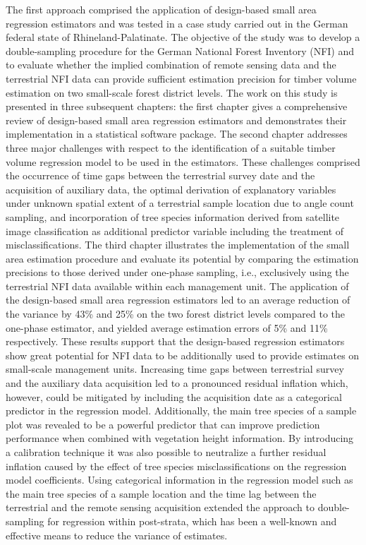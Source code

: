 The first approach comprised the application of design-based small area regression estimators and was tested in a case study carried out in the German federal state of Rhineland-Palatinate. The objective of the study was to develop a double-sampling procedure for the German National Forest Inventory (NFI) and to evaluate whether the implied combination of remote sensing data and the terrestrial NFI data can provide sufficient estimation precision for timber volume estimation on two small-scale forest district levels. The work on this study is presented in three subsequent chapters: the first chapter gives a comprehensive review of design-based small area regression estimators and demonstrates their implementation in a statistical software package. The second chapter addresses three major challenges with respect to the identification of a suitable timber volume regression model to be used in the estimators. These challenges comprised the occurrence of time gaps between the terrestrial survey date and the acquisition of auxiliary data, the optimal derivation of explanatory variables under unknown spatial extent of a terrestrial sample location due to angle count sampling, and incorporation of tree species information derived from satellite image classification as additional predictor variable including the treatment of misclassifications. The third chapter illustrates the implementation of the small area estimation procedure and evaluate its potential by comparing the estimation precisions to those derived under one-phase sampling, i.e., exclusively using the terrestrial NFI data available within each management unit. The application of the design-based small area regression estimators led to an average reduction of the variance by 43\% and 25\% on the two forest district levels compared to the one-phase estimator, and yielded average estimation errors of 5\% and 11\% respectively. These results support that the design-based regression estimators show great potential for NFI data to be additionally used to provide estimates on small-scale management units. Increasing time gaps between terrestrial survey and the auxiliary data acquisition led to a pronounced residual inflation which, however, could be mitigated by including the acquisition date as a categorical predictor in the regression model. Additionally, the main tree species of a sample plot was revealed to be a powerful predictor that can improve prediction performance when combined with vegetation height information. By introducing a calibration technique it was also possible to neutralize a further residual inflation caused by the effect of tree species misclassifications on the regression model coefficients. Using categorical information in the regression model such as the main tree species of a sample location and the time lag between the terrestrial and the remote sensing acquisition extended the approach to double-sampling for regression within post-strata, which has been a well-known and effective means to reduce the variance of estimates.\par

